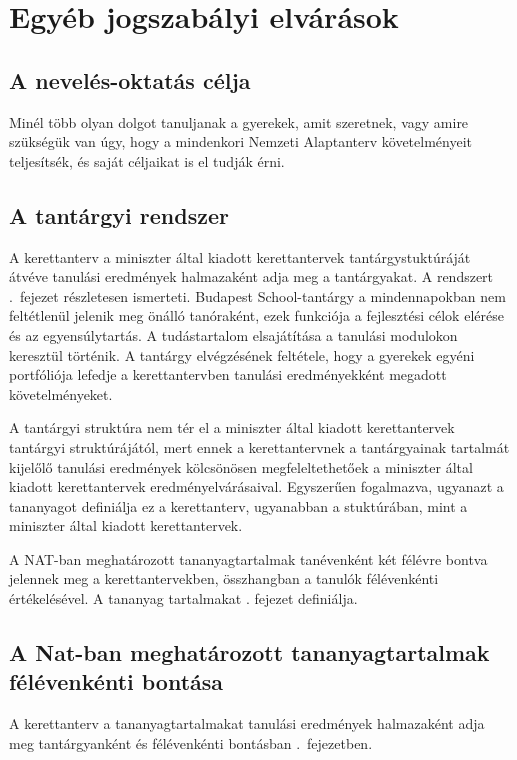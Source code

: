 \chapter[Egyéb jogszabályi elvárások]{Egyéb jogszabályi elvárások}
\label{sec:jogszabalyok}
\section{A nevelés-oktatás célja}

Minél több olyan dolgot tanuljanak a gyerekek, amit szeretnek, vagy amire szükségük van úgy, hogy a mindenkori Nemzeti Alaptanterv követelményeit teljesítsék, és saját céljaikat is el tudják érni.

\section{A tantárgyi rendszer}
\label{sec:jog_tantargy}
A kerettanterv a miniszter által kiadott kerettantervek tantárgystuktúráját átvéve tanulási eredmények halmazaként adja meg a tantárgyakat. A rendszert .~fejezet részletesen ismerteti.  Budapest School-tantárgy a mindennapokban nem feltétlenül jelenik meg önálló tanóraként, ezek funkciója a fejlesztési célok elérése és az egyensúlytartás. A tudástartalom elsajátítása a tanulási modulokon keresztül történik. A tantárgy elvégzésének feltétele, hogy  a gyerekek egyéni portfóliója lefedje a kerettantervben tanulási eredményekként megadott követelményeket.

A tantárgyi struktúra nem tér el a miniszter által kiadott kerettantervek tantárgyi struktúrájától, mert ennek a kerettantervnek a tantárgyainak tartalmát kijelőlő tanulási eredmények kölcsönösen megfeleltethetőek a miniszter által kiadott kerettantervek eredményelvárásaival. Egyszerűen fogalmazva, ugyanazt a tananyagot definiálja ez a kerettanterv, ugyanabban a stuktúrában, mint a miniszter által kiadott kerettantervek. 

A NAT-ban meghatározott tananyagtartalmak tanévenként két félévre bontva jelennek meg a kerettantervekben, összhangban a tanulók félévenkénti értékelésével. A tananyag 
tartalmakat . fejezet definiálja.

\section[A Nat félévenkénti bontása]{A Nat-ban meghatározott tananyagtartalmak félévenkénti bontása}
A kerettanterv a tananyagtartalmakat tanulási eredmények halmazaként adja meg tantárgyanként és félévenkénti bontásban .~fejezetben. 

